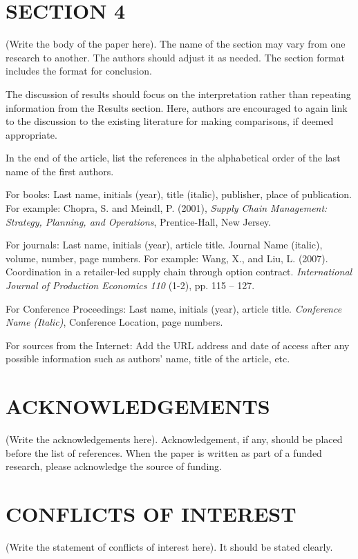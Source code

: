 \documentclass[preprint]{oscmjournal}
\begin{document}
\section{SECTION 4}\label{sec:section_4}
(Write the body of the paper here). The name of the section may vary from one research to another. The authors should adjust it as needed. The section format includes the format for conclusion.

The discussion of results should focus on the interpretation rather than repeating information from the Results section. Here, authors are encouraged to again link to the discussion to the existing literature for making comparisons, if deemed appropriate.

In the end of the article, list the references in the alphabetical order of the last name of the first authors. 

For books: Last name, initials (year), title (italic), publisher, place of publication. For example: Chopra, S. and Meindl, P. (2001), \textit{Supply Chain Management: Strategy, Planning, and Operations}, Prentice-Hall, New Jersey. 

For journals: Last name, initials (year), article title. Journal Name (italic), volume, number, page numbers. For example: Wang, X., and Liu, L. (2007). Coordination in a retailer-led supply chain through option contract. \textit{International Journal of Production Economics 110} (1-2), pp. 115 – 127. 

For Conference Proceedings: Last name, initials (year), article title. \textit{Conference Name (Italic)}, Conference Location, page numbers. 

For sources from the Internet: Add the URL address and date of access after any possible information such as authors’ name, title of the article, etc.


\section*{ACKNOWLEDGEMENTS}
(Write the acknowledgements here). Acknowledgement, if any, should be placed before the list of references. When the paper is written as part of a funded research, please acknowledge the source of funding. 

\section*{CONFLICTS OF INTEREST}
(Write the statement of conflicts of interest here). It should be stated clearly.
\end{document}
